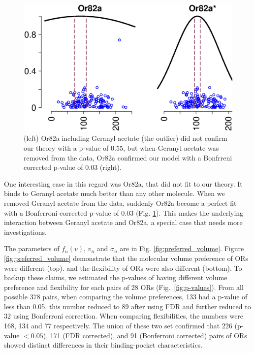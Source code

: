 \documentclass[11pt]{paper} %
\newcommand{\numberofreceptors}{ 28 }
\begin{document}
\begin{figure}
	\centering
	\includegraphics[width= 0.75 \textwidth]{vol-res-Or82a.eps}
	\caption{(left) Or82a including Geranyl acetate (the outlier) did not confirm our theory with a p-value of 0.55, but when Geranyl acetate was removed from the data, 
	Or82a confirmed our model with a Bonfrreni corrected p-value of 0.03 (right).}
	\label{fig:Or82a}
\end{figure}
One interesting case in this regard was Or82a, that did not fit to our theory. 
It binds to Geranyl acetate much better than any other molecule. 
When we removed Geranyl acetate from the data, suddenly Or82a become a perfect fit with a Bonferroni corrected p-value of 0.03 (Fig. \ref{fig:Or82a}). 
This makes the underlying interaction between Geranyl acetate and Or82a, a special case that needs more investigations.

The parameters of $f_n(v)$, $v_n$ and $\sigma_n$ are in Fig. \ref{fig:preferred_volume}.
Figure \ref{fig:preferred_volume} demonstrate that the molecular volume preference of ORs were different (top). 
and the flexibility of ORs were also different (bottom).
To backup these claims, 
we estimated the p-values of having different volume preference and flexibility for each pairs of \numberofreceptors ORs
(Fig.~\ref{fig:p-values}). 
From all possible 378 pairs, 
when comparing the volume preferences, 
133 had a p-value of less than 0.05, 
this number reduced to 89 after using FDR and further reduced to 32 using Bonferroni correction.
When comparing flexibilities, 
the numbers were 168, 134 and 77 respectively. 
The union of these two set confirmed that 226 (p-value $<0.05$), 171 (FDR corrected), and 91 (Bonferroni corrected) pairs of ORs showed distinct differences in their binding-pocket characteristics.
\end{document}
